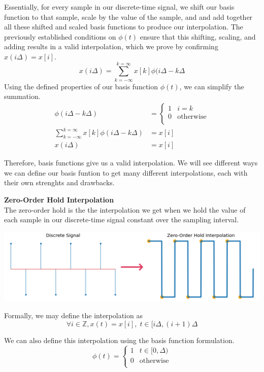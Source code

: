 Essentially, for every sample in our discrete-time signal, we shift our basis function to that sample, scale by the value of the sample, and and add together all these shifted and scaled basis functions to produce our interpolation. The previously established conditions on $\phi(t)$ ensure that this shifting, scaling, and adding results in a valid interpolation, which we prove by confirming $x(i \Delta) = x[i]$.
\begin{equation*}
    x(i \Delta) = \sum_{k=-\infty}^{k=\infty} x[k] \phi(i \Delta - k \Delta
\end{equation*}
Using the defined properties of our basis function $\phi(t)$, we can simplify the summation.
\begin{align*}
\phi(i \Delta - k \Delta)
    &=
    \begin{cases}
        1 & i = k \\
        0 & \text{otherwise} \\
    \end{cases} \\
\sum_{k=-\infty}^{k=\infty} x[k] \phi(i \Delta - k \Delta) &= x[i] \\
x(i \Delta) &= x[i]
\end{align*}

Therefore, basis functions give us a valid interpolation. We will see different ways we can define our basis funtion to get many different interpolations, each with their own strenghts and drawbacks.

\textbf{Zero-Order Hold Interpolation} \\
The zero-order hold is the the interpolation we get when we hold the value of each sample in our discrete-time signal constant over the sampling interval.

\includegraphics[width=\textwidth]{figures/zoh_ex}

Formally, we may define the interpolation as
\begin{equation*}
    \forall i \in \mathbb{Z}, x(t) = x[i],\;t \in [i \Delta, (i + 1) \Delta
\end{equation*}

We can also define this interpolation using the basis function formulation.
\begin{equation*}
    \phi(t) = 
    \begin{cases}
    1 & t \in [0, \Delta) \\
    0 & \text{otherwise} \\
    \end{cases}
\end{equation*}

